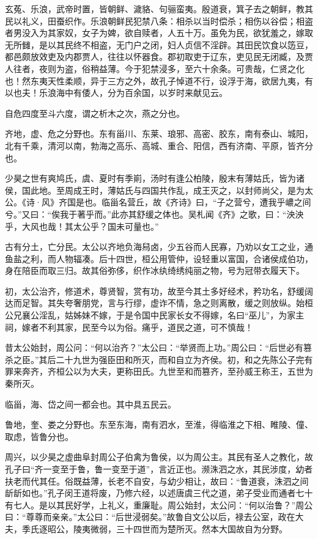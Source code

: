 \documentclass[]{article}
\begin{document}
玄菟、乐浪，武帝时置，皆朝鲜、濊貉、句骊蛮夷。殷道衰，箕子去之朝鲜，教其民以礼义，田蚕织作。乐浪朝鲜民犯禁八条：相杀以当时偿杀；相伤以谷偿；相盗者男没入为其家奴，女子为婢，欲自赎者，人五十万。虽免为民，欲犹羞之，嫁取无所雠，是以其民终不相盗，无门户之闭，妇人贞信不淫辟。其田民饮食以笾豆，都邑颇放效吏及内郡贾人，往往以怀器食。郡初取吏于辽东，吏见民无闭臧，及贾人往者，夜则为盗，俗稍益薄。今于犯禁浸多，至六十余条。可贵哉，仁贤之化也！然东夷天性柔顺，异于三方之外，故孔子悼道不行，设浮于海，欲居九夷，有以也夫！乐浪海中有倭人，分为百余国，以岁时来献见云。

自危四度至斗六度，谓之析木之次，燕之分也。

齐地，虚、危之分野也。东有甾川、东莱、琅邪、高密、胶东，南有泰山、城阳，北有千乘，清河以南，勃海之高乐、高城、重合、阳信，西有济南、平原，皆齐分也。

少昊之世有爽鸠氏，虞、夏时有季崱，汤时有逢公柏陵，殷末有薄姑氏，皆为诸侯，国此地。至周成王时，薄姑氏与四国共作乱，成王灭之，以封师尚父，是为太公。《诗·风》齐国是也。临甾名营丘，故《齐诗》曰，``子之营兮，遭我乎嶩之间兮。''又曰：``俟我于著乎而。''此亦其舒缓之体也。吴札闻《齐》之歌，曰：``泱泱乎，大风也哉！其太公乎？国未可量也。''

古有分土，亡分民。太公以齐地负海舄卤，少五谷而人民寡，乃劝以女工之业，通鱼盐之利，而人物辐凑。后十四世，桓公用管仲，设轻重以富国，合诸侯成伯功，身在陪臣而取三归。故其俗弥侈，织作冰纨绮绣纯丽之物，号为冠带衣履天下。

初，太公治齐，修道术，尊贤智，赏有功，故至今其土多好经术，矜功名，舒缓阔达而足智。其失夸奢朋党，言与行缪，虚诈不情，急之则离散，缓之则放纵。始桓公兄襄公淫乱，姑姊妹不嫁，于是令国中民家长女不得嫁，名曰``巫儿''，为家主祠，嫁者不利其家，民至今以为俗。痛乎，道民之道，可不慎哉！

昔太公始封，周公问：``何以治齐？''太公曰：``举贤而上功。''周公曰：``后世必有篡杀之臣。''其后二十九世为强臣田和所灭，而和自立为齐侯。初，和之先陈公子完有罪来奔齐，齐桓公以为大夫，更称田氏。九世至和而篡齐，至孙威王称王，五世为秦所灭。

临甾，海、岱之间一都会也。其中具五民云。

鲁地，奎、娄之分野也。东至东海，南有泗水，至淮，得临淮之下相、睢陵、僮、取虑，皆鲁分也。

周兴，以少昊之虚曲阜封周公子伯禽为鲁侯，以为周公主。其民有圣人之教化，故孔子曰``齐一变至于鲁，鲁一变至于道''，言近正也。濒洙泗之水，其民涉度，幼者扶老而代其任。俗既益薄，长老不自安，与幼少相让，故曰：``鲁道衰，洙泗之间龂龂如也。''孔子闵王道将废，乃修六经，以述唐虞三代之道，弟子受业而通者七十有七人。是以其民好学，上礼义，重廉耻。周公始封，太公问：``何以治鲁？''周公曰：``尊尊而亲亲。''太公曰：``后世浸弱矣。''故鲁自文公以后，禄去公室，政在大夫，季氏逐昭公，陵夷微弱，三十四世而为楚所灭。然本大国故自为分野。
\end{document}
